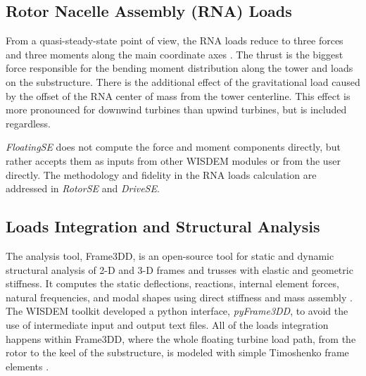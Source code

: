 \subsection{Rotor Nacelle Assembly (RNA) Loads}
From a quasi-steady-state point of view, the RNA loads reduce to three
forces and three moments along the main coordinate axes
\citet{JacketSE}. The thrust is the biggest force responsible for the
bending moment distribution along the tower and loads on the
substructure.  There is the additional effect of the gravitational load
caused by the offset of the RNA center of mass from the tower
centerline.  This effect is more pronounced for downwind turbines than
upwind turbines, but is included regardless.

\textit{FloatingSE} does not compute the force and moment components
directly, but rather accepts them as inputs from other WISDEM modules or
from the user directly.  The methodology and fidelity in the RNA loads
calculation are addressed in \textit{RotorSE} and \textit{DriveSE}.


\subsection{Loads Integration and Structural Analysis}
The analysis tool, Frame3DD, is an open-source tool for static and
dynamic structural analysis of 2-D and 3-D frames and trusses with
elastic and geometric stiffness. It computes the static deflections,
reactions, internal element forces, natural frequencies, and modal
shapes using direct stiffness and mass assembly \citep{frame3dd}.  The
WISDEM toolkit developed a python interface, \textit{pyFrame3DD}, to
avoid the use of intermediate input and output text files.  All of the
loads integration happens within Frame3DD, where the whole floating
turbine load path, from the rotor to the keel of the substructure, is
modeled with simple Timoshenko frame elements \citep{timoshenko}.


